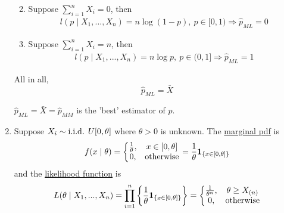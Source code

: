 \documentclass[11pt]{elegantbook}
\begin{document}
\begin{example}
\begin{enumerate}
\begin{enumerate}
\begin{equation}
        \end{equation}
        \item Suppose $\sum_{i=1}^n X_i=0$, then
        \begin{equation}
            \begin{aligned}
                l(p\mid X_1,...,X_n)=n\log (1-p),\ p\in [0,1)
                \Rightarrow \hat{p}_{ML}=0
            \end{aligned}
            \nonumber
        \end{equation}
        \item Suppose $\sum_{i=1}^n X_i=n$, then
        \begin{equation}
            \begin{aligned}
                l(p\mid X_1,...,X_n)=n\log p,\ p\in (0,1]
                \Rightarrow \hat{p}_{ML}=1
            \end{aligned}
            \nonumber
        \end{equation}
    \end{enumerate}
    All in all, $$\hat{p}_{ML}=\bar{X}$$
    \begin{remark}
        $\hat{p}_{ML}=\bar{X}=\hat{p}_{MM}$ is the 'best' estimator of $p$.
    \end{remark}
    \item Suppose $X_i\sim \textnormal{i.i.d. } U[0,\theta]$ where $\theta>0$ is unknown. The \underline{marginal pdf} is
    \begin{equation}
        \begin{aligned}
            f(x\mid \theta)=\left\{\begin{matrix}
                \frac{1}{\theta},&x\in[0,\theta]\\
                0,&\textnormal{otherwise}
            \end{matrix}\right.=\frac{1}{\theta}\mathbf{1}_{\{x\in[0,\theta]\}}
        \end{aligned}
        \nonumber
    \end{equation}
    and the \underline{likelihood function} is
    \begin{equation}
        \begin{aligned}
            L(\theta\mid X_1,...,X_n)
            =\prod_{i=1}^n\left\{ \frac{1}{\theta}\mathbf{1}_{\{x\in[0,\theta]\}}\right\}
            =\left\{\begin{matrix}
                \frac{1}{\theta^n},&\theta\geq X_{(n)}\\
                0,&\textnormal{otherwise}
            \end{matrix}\right.\\

\end{aligned}
\end{equation}
\end{enumerate}
\end{example}
\end{document}
